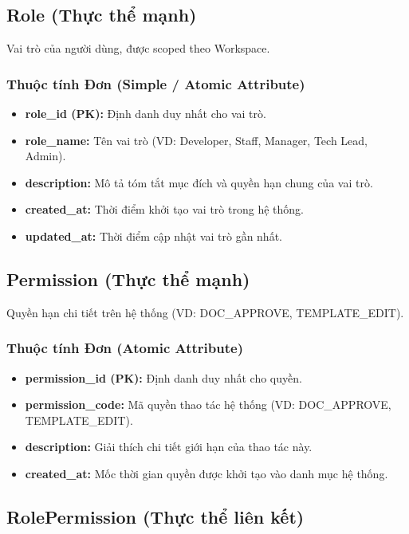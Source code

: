 \subsection{Role (Thực thể mạnh)}

Vai trò của người dùng, được scoped theo Workspace.

\subsubsection{Thuộc tính Đơn (Simple / Atomic Attribute)}

\begin{itemize}
    \item \textbf{role\_id (PK):} Định danh duy nhất cho vai trò.
    \item \textbf{role\_name:} Tên vai trò (VD: Developer, Staff, Manager, Tech Lead, Admin).
    \item \textbf{description:} Mô tả tóm tắt mục đích và quyền hạn chung của vai trò.
    \item \textbf{created\_at:} Thời điểm khởi tạo vai trò trong hệ thống.
    \item \textbf{updated\_at:} Thời điểm cập nhật vai trò gần nhất.
\end{itemize}


\subsection{Permission (Thực thể mạnh)}

Quyền hạn chi tiết trên hệ thống (VD: DOC\_APPROVE, TEMPLATE\_EDIT).

\subsubsection{Thuộc tính Đơn (Atomic Attribute)}

\begin{itemize}
    \item \textbf{permission\_id (PK):} Định danh duy nhất cho quyền.
    \item \textbf{permission\_code:} Mã quyền thao tác hệ thống (VD: DOC\_APPROVE, TEMPLATE\_EDIT).
    \item \textbf{description:} Giải thích chi tiết giới hạn của thao tác này.
    \item \textbf{created\_at:} Mốc thời gian quyền được khởi tạo vào danh mục hệ thống.
\end{itemize}


\subsection{RolePermission (Thực thể liên kết)}

